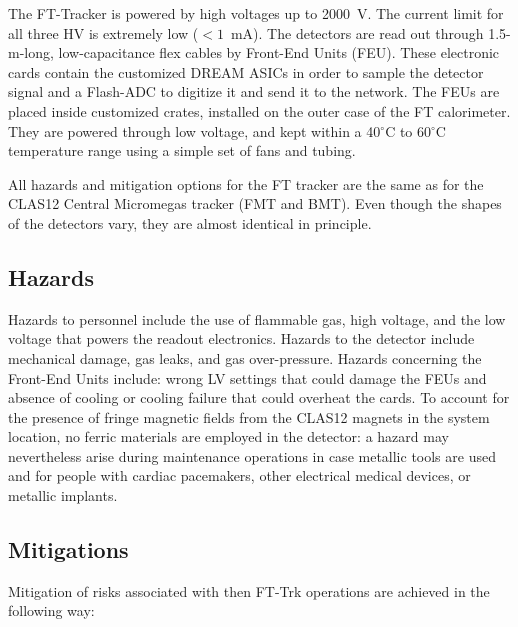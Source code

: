 The FT-Tracker is powered by high voltages up to 2000~V. The current limit for all three HV is 
extremely low ($< 1$~mA). The detectors are read out through 1.5-m-long, low-capacitance flex 
cables by Front-End Units (FEU). These electronic cards contain the customized DREAM ASICs in 
order to sample the detector signal and a Flash-ADC to digitize it and send it to the network. 
The FEUs are placed inside customized crates, installed on the outer case of the FT calorimeter. 
They are powered through low voltage, and kept within a 40$^\circ$C to 60$^\circ$C temperature 
range using a simple set of fans and tubing.

All hazards and mitigation options for the FT tracker are the same as for the CLAS12 Central 
Micromegas tracker (FMT and BMT). Even though the shapes of the detectors vary, they are almost 
identical in principle. 

\subsection{Hazards}

Hazards to personnel include the use of flammable gas, high voltage, and the low voltage that 
powers the readout electronics. Hazards to the detector include mechanical damage, gas leaks, 
and gas over-pressure. Hazards concerning the Front-End Units include: wrong LV settings that 
could damage the FEUs and absence of cooling or cooling failure that could overheat the cards. 
To account for the presence of fringe magnetic fields from the CLAS12 magnets in the system 
location, no ferric materials are employed in the detector: a hazard may nevertheless arise 
during maintenance operations in case metallic tools are used and for people with cardiac 
pacemakers, other electrical medical devices, or metallic implants.

\subsection{Mitigations}

Mitigation of risks associated with then FT-Trk operations are achieved in the following way:

